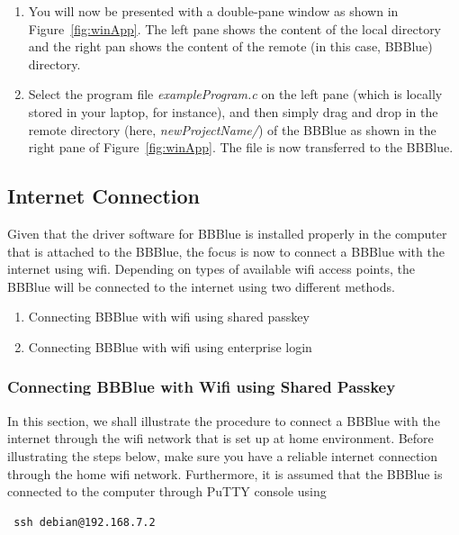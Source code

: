 \begin{enumerate}
  \item You will now be presented with a double-pane window as shown in
    Figure~\ref{fig:winApp}. The left pane shows the content of the local
    directory and the right pan shows the content of the remote (in this case,
    BBBlue) directory. %
    
    \item Select the program file \emph{exampleProgram.c} on the left pane
      (which is locally stored in your laptop, for instance), and then simply drag and drop in the remote directory (here, \emph{newProjectName/}) of the BBBlue as shown in the right pane of Figure~\ref{fig:winApp}. The file is now transferred to the BBBlue.%

    
\end{enumerate}

\subsection{Internet Connection}
Given that the driver software for BBBlue is installed properly in the computer
that is attached to the BBBlue, the focus is now to connect a BBBlue with the
internet using wifi. Depending on types of available wifi access points, the
BBBlue will be connected to the internet using two different methods. %
%
\begin{enumerate}
\item Connecting BBBlue with wifi using shared passkey
  
\item Connecting BBBlue with wifi using enterprise login  
\end{enumerate}

\subsubsection{Connecting BBBlue with Wifi using Shared Passkey}

In this section, we shall illustrate the procedure to connect a BBBlue with the
internet through the wifi network that is set up at home environment. Before
illustrating the steps below, make sure you have a reliable internet connection
through the home wifi network. Furthermore, it is assumed that the BBBlue is
connected to the computer through PuTTY console using 

\begin{verbatim}
 ssh debian@192.168.7.2
\end{verbatim}


